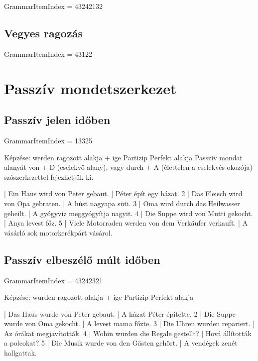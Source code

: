 \documentclass{article}
\newenvironment{desc}{\verbatim}{\endverbatim}
\newenvironment{exmp}{\verbatim}{\endverbatim}
\begin{document}
GrammarItemIndex = 43242132

\subsection{Vegyes ragozás}

GrammarItemIndex = 43122

\section{Passzív mondetszerkezet}

\subsection{Passzív jelen időben}

GrammarItemIndex = 13325

\begin{desc}
Képzése: werden ragozott alakja + ige Partizip Perfekt alakja
Passziv mondat alanyát von + D (cselekvő alany), vagy durch + A (élettelen a cselekvés okozója) szószerkezettel fejezhetjük ki.
\end{desc}

\begin{exmp}
1 | Ein Haus wird von Peter gebaut. | Péter épít egy házat.
2 | Das Fleisch wird von Opa gebraten. | A húst nagyapa süti.
3 | Oma wird durch das Heilwasser geheilt. | A gyógyvíz meggyógyítja nagyit.
4 | Die Suppe wird von Mutti gekocht. | Anya levest főz.
5 | Viele Motorraden werden von dem Verkäufer verkauft. | A vásárló sok motorkerékpárt vásárol.
\end{exmp}

\subsection{Passzív elbeszélő múlt időben}

GrammarItemIndex = 43242321

\begin{desc}
Képzése: wurden ragozott alakja + ige Partizip Perfekt alakja
\end{desc}

\begin{exmp}
1 | Das Haus wurde von Peter gebaut. | A házat Péter építette.
2 | Die Suppe wurde von Oma gekocht. | A levest mama főzte.
3 | Die Uhren wurden repariert. | Az órákat megjavították.
4 | Wohin wurden die Regale gestellt? | Hová állították a polcokat?
5 | Die Musik wurde von den Gästen gehört. | A vendégek zenét hallgattak.
\end{exmp}
\end{document}
